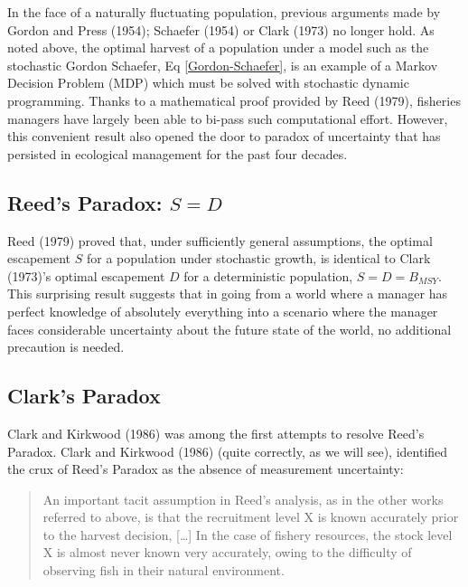 \documentclass[3p]{elsarticle} %
\begin{document}
In the face of a naturally fluctuating population, previous arguments
made by Gordon and Press (1954); Schaefer (1954) or Clark (1973) no
longer hold. As noted above, the optimal harvest of a population under a
model such as the stochastic Gordon Schaefer, Eq
\eqref{Gordon-Schaefer}, is an example of a Markov Decision Problem
(MDP) which must be solved with stochastic dynamic programming. Thanks
to a mathematical proof provided by Reed (1979), fisheries managers have
largely been able to bi-pass such computational effort. However, this
convenient result also opened the door to paradox of uncertainty that
has persisted in ecological management for the past four decades.

\hypertarget{reeds-paradox-s-d}{%
\subsection{\texorpdfstring{Reed's Paradox:
\(S = D\)}{Reed's Paradox: S = D}}\label{reeds-paradox-s-d}}

Reed (1979) proved that, under sufficiently general assumptions, the
optimal escapement \(S\) for a population under stochastic growth, is
identical to Clark (1973)'s optimal escapement \(D\) for a deterministic
population, \(S = D = B_{MSY}\). This surprising result suggests that in
going from a world where a manager has perfect knowledge of absolutely
everything into a scenario where the manager faces considerable
uncertainty about the future state of the world, no additional
precaution is needed.

\hypertarget{clarks-paradox}{%
\subsection{Clark's Paradox}\label{clarks-paradox}}

Clark and Kirkwood (1986) was among the first attempts to resolve Reed's
Paradox. Clark and Kirkwood (1986) (quite correctly, as we will see),
identified the crux of Reed's Paradox as the absence of measurement
uncertainty:

\begin{quote}
An important tacit assumption in Reed's analysis, as in the other works
referred to above, is that the recruitment level X is known accurately
prior to the harvest decision, {[}\ldots{}{]} In the case of fishery
resources, the stock level X is almost never known very accurately,
owing to the difficulty of observing fish in their natural environment.
\end{quote}
\end{document}
